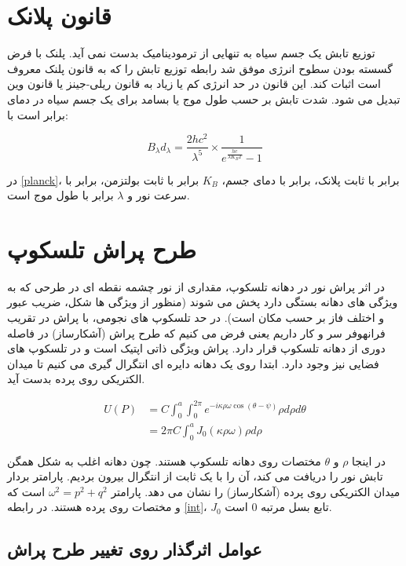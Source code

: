\documentclass{report}
\begin{document}
\section{قانون پلانک}
توزیع تابش یک جسم سیاه به تنهایی از ترمودینامیک بدست نمی آید. پلنک با فرض گسسته بودن سطوح
انرژی موفق شد رابطه توزیع تابش را که به قانون پلنک معروف است اثبات کند. این قانون در حد انرژی کم
یا زیاد به قانون ریلی-جینز یا قانون وین تبدیل می شود. شدت تابش بر حسب طول موج یا بسامد برای یک
جسم سیاه در دمای  برابر است با: \cite[صفحه 5]{leblanc2011introduction}

\begin{equation} \label{planck}
B_\lambda d_\lambda = \frac{2hc^2}{\lambda^5}\times\frac{1}{e^\frac{hc}{\lambda K_B T} - 1}
\end{equation}

\noindent در \autoref{planck}،  برابر با ثابت پلانک،  برابر با دمای جسم، $K_B$ برابر با ثابت بولتزمن،  برابر با سرعت نور و $\lambda$ برابر با طول موج است.

\section{طرح پراش تلسکوپ}

در اثر پراش نور در دهانه تلسکوپ، مقداری از نور چشمه نقطه ای در طرحی که به ویژگی های دهانه بستگی
دارد پخش می شوند (منظور از ویژگی ها شکل، ضریب عبور و اختلف فاز بر حسب مکان است). در حد
تلسکوپ های نجومی، با پراش در تقریب فرانهوفر سر و کار داریم یعنی فرض می کنیم که طرح پراش
(آشکارساز) در فاصله دوری از دهانه تلسکوپ قرار دارد. پراش ویژگی ذاتی اپتیک است و در تلسکوپ های
فضایی نیز وجود دارد. ابتدا روی یک دهانه دایره ای انتگرال گیری می کنیم تا 
میدان الکتریکی روی پرده بدست آید.

\begin{align} \label{int}
U(P) & = C\int^a_0 \int^{2\pi}_0 e^{-i\kappa \rho \omega \cos(\theta - \psi)} \rho d\rho d\theta \\
& = 2\pi C \int^a_0 J_0(\kappa \rho \omega)\rho d\rho
\end{align}

در اینجا  $\rho$  و $\theta$ مختصات روی دهانه تلسکوپ هستند. چون دهانه اغلب به شکل همگن تابش نور را دریافت
می کند، آن را با یک ثابت از انتگرال بیرون بردیم. پارامتر  بردار میدان الکتریکی روی پرده (آشکارساز) را
نشان می دهد. پارامتر $\omega^2 = p^2 + q^2$ است که  و  مختصات روی پرده هستند. در رابطه \ref{int}، $J_0$ تابع بسل مرتبه 0 است.

\subsection{عوامل اثرگذار روی تغییر طرح پراش}
\end{document}
